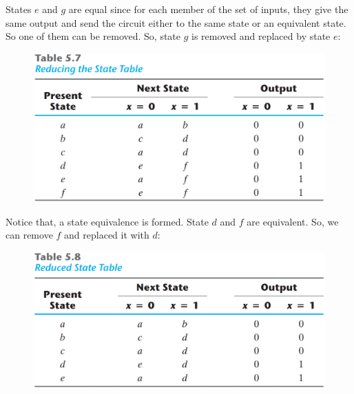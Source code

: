 States $e$ and $g$ are equal since for each member of the set of inputs, they give the same output and send the circuit either to the same state or an equivalent state. So one of them can be removed. So, state $g$ is removed and replaced by state $e$:
\begin{figure}[H]
  \centering
  \includegraphics[width=\linewidth]{img/table-5.7.png}
  \label{table:5.7}
\end{figure}
Notice that, a state equivalence is formed. State $d$ and $f$ are equivalent. So, we can remove $f$ and replaced it with $d$:
\begin{figure}[H]
  \centering
  \includegraphics[width=\linewidth]{img/table-5.8.png}
  \label{table:5.8}
\end{figure}
